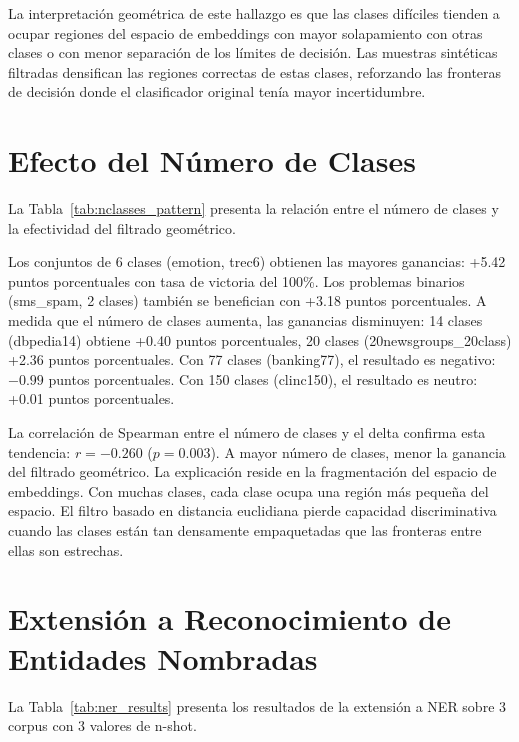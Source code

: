 La interpretación geométrica de este hallazgo es que las clases difíciles tienden a ocupar regiones del espacio de embeddings con mayor solapamiento con otras clases o con menor separación de los límites de decisión. Las muestras sintéticas filtradas densifican las regiones correctas de estas clases, reforzando las fronteras de decisión donde el clasificador original tenía mayor incertidumbre.

\section{Efecto del Número de Clases}
\label{sec:efecto_clases}

La Tabla~\ref{tab:nclasses_pattern} presenta la relación entre el número de clases y la efectividad del filtrado geométrico.



Los conjuntos de 6 clases (emotion, trec6) obtienen las mayores ganancias: +5.42 puntos porcentuales con tasa de victoria del 100\%. Los problemas binarios (sms\_spam, 2 clases) también se benefician con +3.18 puntos porcentuales. A medida que el número de clases aumenta, las ganancias disminuyen: 14 clases (dbpedia14) obtiene +0.40 puntos porcentuales, 20 clases (20newsgroups\_20class) +2.36 puntos porcentuales. Con 77 clases (banking77), el resultado es negativo: $-0.99$ puntos porcentuales. Con 150 clases (clinc150), el resultado es neutro: +0.01 puntos porcentuales.

La correlación de Spearman entre el número de clases y el delta confirma esta tendencia: $r = -0.260$ ($p = 0.003$). A mayor número de clases, menor la ganancia del filtrado geométrico. La explicación reside en la fragmentación del espacio de embeddings. Con muchas clases, cada clase ocupa una región más pequeña del espacio. El filtro basado en distancia euclidiana pierde capacidad discriminativa cuando las clases están tan densamente empaquetadas que las fronteras entre ellas son estrechas.

\section{Extensión a Reconocimiento de Entidades Nombradas}
\label{sec:extension_ner}

La Tabla~\ref{tab:ner_results} presenta los resultados de la extensión a NER sobre 3 corpus con 3 valores de n-shot.




